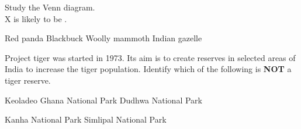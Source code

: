 


\begin{center}
\end{center}

\begin{questions}

\question Study the Venn diagram. \\ X is likely to be \fillin . \\


\begin{randomizeoneparchoices}
    \CorrectChoice Red panda
    \choice Blackbuck
    \choice Woolly mammoth
    \choice Indian gazelle
\end{randomizeoneparchoices}

\question Project tiger was started in 1973. Its aim is to create reserves in selected areas of India to increase the tiger population. Identify which of the following is \textbf{NOT} a tiger reserve.

    \begin{choices}
        \begin{minipage}[t]{0.45\textwidth}
        \CorrectChoice Keoladeo Ghana National Park
        \choice Dudhwa National Park
    \end{minipage}
    \begin{minipage}[t]{0.45\textwidth}
        \choice Kanha National Park
        \choice Simlipal National Park
    \end{minipage}
    \end{choices}


\end{questions}

